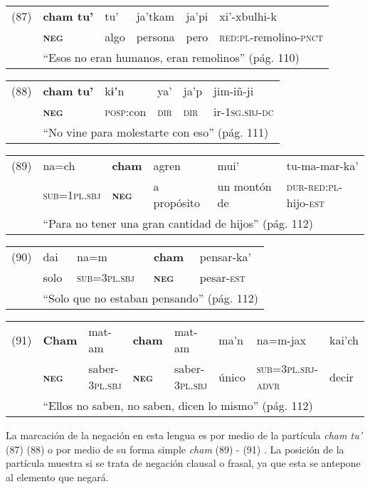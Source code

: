 {\setmainfont{Charis SIL} 

\begin{tabular}{llllll}
(87) & \textbf{cham tu’} & tu’ & ja’tkam & ja’pi & xi’-xbulhi-k  \\
& \textsc{\textbf{neg}} & algo & persona & pero & \textsc{red:pl}-remolino-\textsc{pnct}\\
& \multicolumn{5}{l}{``Esos no eran humanos, eran remolinos'' (pág. 110)}
\end{tabular} \vspace{0.5cm}

\begin{tabular}{llllll}
(88) & \textbf{cham tu’} & kɨʼn & ya’ & ja’p & jim-iñ-ji \\
& \textsc{\textbf{neg}} & \textsc{posp}:con & \textsc{dir} & \textsc{dir} & ir-\textsc{1sg.sbj-dc} \\
& \multicolumn{5}{l}{``No vine para molestarte con eso'' (pág. 111)}
\end{tabular} \vspace{0.5cm}

\begin{tabular}{llllll}
(89) & na=ch & \textbf{cham} & agren & mui’ & tu-ma-mar-ka’ \\
& \textsc{sub=1pl.sbj} & \textsc{\textbf{neg}} & a propósito & un montón de & \textsc{dur-red:pl}-hijo-\textsc{est} \\
& \multicolumn{5}{l}{``Para no tener una gran cantidad de hijos'' (pág. 112)}
\end{tabular} \vspace{0.5cm}

\begin{tabular}{lllll}
(90) & dai & na=m & \textbf{cham} & pensar-ka’ \\
& solo & \textsc{sub=3pl.sbj} & \textsc{\textbf{neg}} & pesar-\textsc{est} \\
& \multicolumn{4}{l}{``Solo que no estaban pensando'' (pág. 112)}
\end{tabular} \vspace{0.5cm}

{\small
\begin{tabular}{llllllll}
(91) & \textbf{Cham} & mat-am & \textbf{cham} & mat-am & ma’n & na=m-jax & kai’ch \\
& \textsc{\textbf{neg}} & saber-\textsc{3pl.sbj} & \textsc{\textbf{neg}} & saber-\textsc{3pl.sbj} & único & \textsc{sub=3pl.sbj-advr} & decir \\
& \multicolumn{7}{l}{``Ellos no saben, no saben, dicen lo mismo'' (pág. 112)}
\end{tabular} \vspace{0.5cm} }

}

La marcación de la negación en esta lengua es por medio de la partícula {\setmainfont{Charis SIL} \textit{cham tu’}} (87) (88) o por medio de su forma simple {\setmainfont{Charis SIL} \textit{cham}} (89) - (91) \textcolor{MidnightBlue}{\citep{Tepehuano}}. La posición de la partícula muestra si se trata de negación clausal o frasal, ya que esta se antepone al elemento que negará.